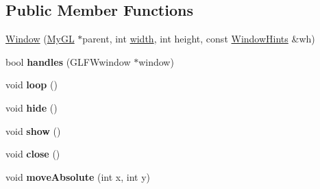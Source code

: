 \subsection*{Public Member Functions}
\begin{DoxyCompactItemize}
\item 
\hyperlink{classWindow_a5996bf7ae672cc3e084d323e4163e4e3}{Window} (\hyperlink{classMyGL}{My\+G\+L} $\ast$parent, int \hyperlink{classWindow_af5b1c436782cc9752d386493fbc5dc8c}{width}, int height, const \hyperlink{structWindowHints}{Window\+Hints} \&wh)
\item 
\hypertarget{classWindow_aad13ee91d93d4033a6e6a8c9cb4ac71f}{}bool {\bfseries handles} (G\+L\+F\+Wwindow $\ast$window)\label{classWindow_aad13ee91d93d4033a6e6a8c9cb4ac71f}

\item 
\hypertarget{classWindow_a4f45493b0f1be74fcee972da50fb8d67}{}void {\bfseries loop} ()\label{classWindow_a4f45493b0f1be74fcee972da50fb8d67}

\item 
\hypertarget{classWindow_a4626829d3cb9d01285f739d2bbc69b74}{}void {\bfseries hide} ()\label{classWindow_a4626829d3cb9d01285f739d2bbc69b74}

\item 
\hypertarget{classWindow_a8f986e19a11c4c97ed8e6ad3d0e648b7}{}void {\bfseries show} ()\label{classWindow_a8f986e19a11c4c97ed8e6ad3d0e648b7}

\item 
\hypertarget{classWindow_a35055c04498121d39741bfcd5082705b}{}void {\bfseries close} ()\label{classWindow_a35055c04498121d39741bfcd5082705b}

\item 
\hypertarget{classWindow_a2132a9fc012c4bbabb0167b027578308}{}void {\bfseries move\+Absolute} (int x, int y)\label{classWindow_a2132a9fc012c4bbabb0167b027578308}

\end{DoxyCompactItemize}
